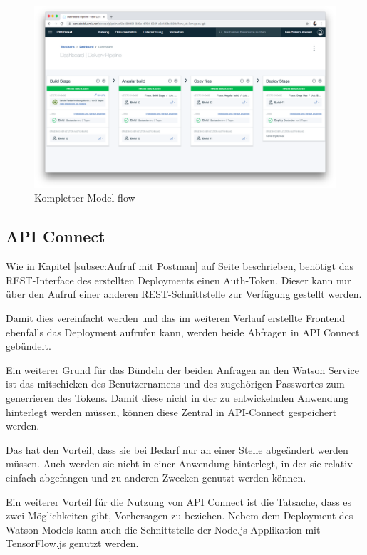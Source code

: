 \begin{figure}[h]
    \centering
    \includegraphics[scale=0.26]{images/kapitel_3/toolchain_pipeline.png}
    \caption{Kompletter Model flow}
    \label{fig:umsetzung_toolchain_pipeline}
\end{figure}

\subsection{API Connect}
Wie in Kapitel \ref{subsec:Aufruf mit Postman} auf Seite \pageref{subsec:Aufruf mit Postman} beschrieben, benötigt das
REST-Interface des erstellten Deployments einen Auth-Token. Dieser kann nur über den Aufruf einer anderen
REST-Schnittstelle zur Verfügung gestellt werden.

Damit dies vereinfacht werden und das im weiteren Verlauf erstellte Frontend ebenfalls das Deployment aufrufen kann,
werden beide Abfragen in API Connect gebündelt.

Ein weiterer Grund für das Bündeln der beiden Anfragen an den Watson Service ist das mitschicken des Benutzernamens und
des zugehörigen Passwortes zum generrieren des Tokens. Damit diese nicht in der zu entwickelnden Anwendung hinterlegt
werden müssen, können diese Zentral in API-Connect gespeichert werden.

Das hat den Vorteil, dass sie bei Bedarf nur an einer Stelle abgeändert werden müssen. Auch werden sie nicht in einer
Anwendung hinterlegt, in der sie relativ einfach abgefangen und zu anderen Zwecken genutzt werden können.

Ein weiterer Vorteil für die Nutzung von API Connect ist die Tatsache, dass es zwei Möglichkeiten gibt, Vorhersagen zu
beziehen. Nebem dem Deployment des Watson Models kann auch die Schnittstelle der Node.js-Applikation mit TensorFlow.js
genutzt werden.

